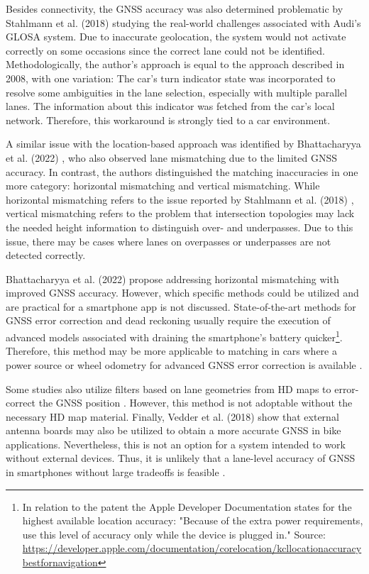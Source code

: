 Besides connectivity, the GNSS accuracy was also determined problematic by Stahlmann et al. (2018) \cite{stahlmann_exploring_2018} studying the real-world challenges associated with Audi's GLOSA system. Due to inaccurate geolocation, the system would not activate correctly on some occasions since the correct lane could not be identified. Methodologically, the author's approach is equal to the approach described in 2008, with one variation: The car's turn indicator state was incorporated to resolve some ambiguities in the lane selection, especially with multiple parallel lanes. The information about this indicator was fetched from the car's local network. Therefore, this workaround is strongly tied to a car environment.

A similar issue with the location-based approach was identified by Bhattacharyya et al. (2022) \cite{bhattacharyya_assessing_2022}, who also observed lane mismatching due to the limited GNSS accuracy. In contrast, the authors distinguished the matching inaccuracies in one more category: horizontal mismatching and vertical mismatching. While horizontal mismatching refers to the issue reported by Stahlmann et al. (2018) \cite{stahlmann_exploring_2018}, vertical mismatching refers to the problem that intersection topologies may lack the needed height information to distinguish over- and underpasses. Due to this issue, there may be cases where lanes on overpasses or underpasses are not detected correctly.

Bhattacharyya et al. (2022) \cite{bhattacharyya_assessing_2022} propose addressing horizontal mismatching with improved GNSS accuracy. However, which specific methods could be utilized and are practical for a smartphone app is not discussed. State-of-the-art methods for GNSS error correction and dead reckoning usually require the execution of advanced models \cite{werner_machine_2020} associated with draining the smartphone's battery quicker\footnote{In relation to the patent \cite{werner_machine_2020} the Apple Developer Documentation states for the highest available location accuracy: "Because of the extra power requirements, use this level of accuracy only while the device is plugged in." Source: \url{https://developer.apple.com/documentation/corelocation/kcllocationaccuracybestfornavigation}}. Therefore, this method may be more applicable to matching in cars where a power source or wheel odometry for advanced GNSS error correction is available \cite{merriaux_wheel_2014}. 

Some studies also utilize filters based on lane geometries from HD maps to error-correct the GNSS position \cite{toledo-moreo_lane-level_2010, li_lane-level_2017}. However, this method is not adoptable without the necessary HD map material. Finally, Vedder et al. (2018) \cite{vedder_accurate_2018} show that external antenna boards may also be utilized to obtain a more accurate GNSS in bike applications. Nevertheless, this is not an option for a system intended to work without external devices. Thus, it is unlikely that a lane-level accuracy of GNSS in smartphones without large tradeoffs is feasible \cite{lindsey_feasibility_2013}.

